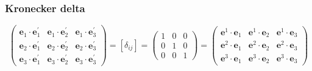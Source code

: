 \documentclass[
]{book}
\theoremstyle{definition}
\theoremstyle{definition}
\theoremstyle{definition}
\theoremstyle{definition}
\theoremstyle{remark}
\begin{document}
\hypertarget{kronecker-delta}{%
\subsubsection{Kronecker delta}\label{kronecker-delta}}

\[
\begin{pmatrix}\boldsymbol{e}_{{\scriptscriptstyle 1}}\cdot\boldsymbol{e}_{{\scriptscriptstyle 1}}^{\prime} & \boldsymbol{e}_{{\scriptscriptstyle 1}}\cdot\boldsymbol{e}_{{\scriptscriptstyle 2}}^{\prime} & \boldsymbol{e}_{{\scriptscriptstyle 1}}\cdot\boldsymbol{e}_{{\scriptscriptstyle 3}}^{\prime}\\
\boldsymbol{e}_{{\scriptscriptstyle 2}}\cdot\boldsymbol{e}_{{\scriptscriptstyle 1}}^{\prime} & \boldsymbol{e}_{{\scriptscriptstyle 2}}\cdot\boldsymbol{e}_{{\scriptscriptstyle 2}}^{\prime} & \boldsymbol{e}_{{\scriptscriptstyle 2}}\cdot\boldsymbol{e}_{{\scriptscriptstyle 3}}^{\prime}\\
\boldsymbol{e}_{{\scriptscriptstyle 3}}\cdot\boldsymbol{e}_{{\scriptscriptstyle 1}}^{\prime} & \boldsymbol{e}_{{\scriptscriptstyle 3}}\cdot\boldsymbol{e}_{{\scriptscriptstyle 2}}^{\prime} & \boldsymbol{e}_{{\scriptscriptstyle 3}}\cdot\boldsymbol{e}_{{\scriptscriptstyle 3}}^{\prime}
\end{pmatrix}=\left[\delta_{{\scriptscriptstyle ij}}\right]=\begin{pmatrix}1 & 0 & 0\\
0 & 1 & 0\\
0 & 0 & 1
\end{pmatrix}=\begin{pmatrix}\boldsymbol{e}^{{\scriptscriptstyle 1}}\cdot\boldsymbol{e}_{{\scriptscriptstyle 1}} & \boldsymbol{e}^{{\scriptscriptstyle 1}}\cdot\boldsymbol{e}_{{\scriptscriptstyle 2}} & \boldsymbol{e}^{{\scriptscriptstyle 1}}\cdot\boldsymbol{e}_{{\scriptscriptstyle 3}}\\
\boldsymbol{e}^{{\scriptscriptstyle 2}}\cdot\boldsymbol{e}_{{\scriptscriptstyle 1}} & \boldsymbol{e}^{{\scriptscriptstyle 2}}\cdot\boldsymbol{e}_{{\scriptscriptstyle 2}} & \boldsymbol{e}^{{\scriptscriptstyle 2}}\cdot\boldsymbol{e}_{{\scriptscriptstyle 3}}\\
\boldsymbol{e}^{{\scriptscriptstyle 3}}\cdot\boldsymbol{e}_{{\scriptscriptstyle 1}} & \boldsymbol{e}^{{\scriptscriptstyle 3}}\cdot\boldsymbol{e}_{{\scriptscriptstyle 2}} & \boldsymbol{e}^{{\scriptscriptstyle 3}}\cdot\boldsymbol{e}_{{\scriptscriptstyle 3}}
\end{pmatrix}
\]
\end{document}
